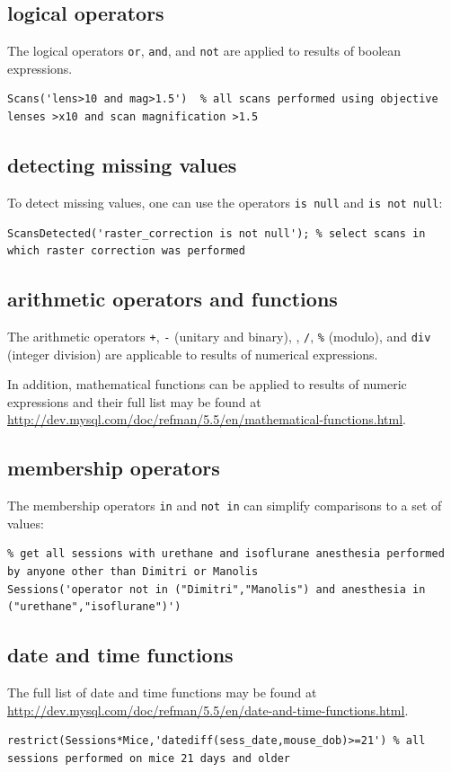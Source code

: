 \documentclass[10pt]{article}
\begin{document}
\subsection{logical operators}
The logical operators {\tt or}, {\tt and}, and {\tt not} are applied to results of boolean expressions.
\begin{lstlisting}
Scans('lens>10 and mag>1.5')  % all scans performed using objective lenses >x10 and scan magnification >1.5
\end{lstlisting}

\subsection{detecting missing values}
To detect missing values, one can use the operators {\tt is null} and {\tt is not null}:
\begin{lstlisting}
ScansDetected('raster_correction is not null'); % select scans in which raster correction was performed
\end{lstlisting}

\subsection{arithmetic operators and functions}
The arithmetic operators {\tt +}, {\tt -} (unitary and binary), {\tt *}, {\tt /}, {\tt \%} (modulo), and {\tt div} (integer division) are applicable to results of numerical expressions. 

In addition, mathematical functions can be applied to results of numeric expressions and their full list may be found at 
\url{http://dev.mysql.com/doc/refman/5.5/en/mathematical-functions.html}.

\subsection{membership operators}
The membership operators {\tt in} and {\tt not in} can simplify comparisons to a set of values: 
\begin{lstlisting}
% get all sessions with urethane and isoflurane anesthesia performed by anyone other than Dimitri or Manolis
Sessions('operator not in ("Dimitri","Manolis") and anesthesia in ("urethane","isoflurane")')
\end{lstlisting}

\subsection{date and time functions}
The full list of date and time functions may be found at \url{http://dev.mysql.com/doc/refman/5.5/en/date-and-time-functions.html}.  
\begin{lstlisting}
restrict(Sessions*Mice,'datediff(sess_date,mouse_dob)>=21') % all sessions performed on mice 21 days and older
\end{lstlisting}
\end{document}
